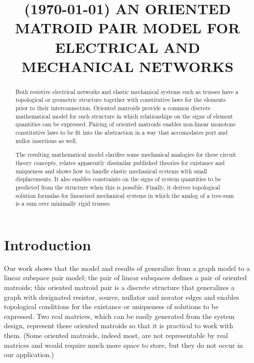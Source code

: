 \documentclass{article}
\title{\extra{REPORT:}
(\today)
AN ORIENTED MATROID PAIR MODEL FOR ELECTRICAL AND MECHANICAL NETWORKS
}
\newcommand{\extra}[1]{{\small{#1}}}
\begin{document}
%
\maketitle
%

\begin{abstract}
Both resistive electrical networks and elastic mechanical systems such
as trusses have a topological or geometric structure together with constitutive
laws for the elements prior to their interconnection.
Oriented matroids provide a common discrete mathematical model 
for such 
structure
in which relationships on the signs of element 
quantities can be expressed.
Pairing of oriented matroids
enables non-linear monotone constitutive laws to be fit
into the abstraction in a way that accomodates port and nullor
insertions as well.

The resulting mathematical model clarifies some mechanical analogies for 
these 
circuit theory concepts, 
relates apparently dissimilar published theories
for existance and uniqueness and shows how to 
handle elastic mechanical systems with small displacements.
It also enables constraints on the signs of system quantities
to be predicted from the structure when this is possible.
\extra{Finally, it 
derives topological solution formulas for linearized mechanical 
systems in which the analog of a tree-sum is a sum over minimally rigid
trusses.}
\end{abstract}
%

\section{Introduction}
\label{sec:intro}

Our work \cite{sdcOMP} shows that the model and results of 
\cite{HaslerDApplMath,HaslerNeirynck} generalize from a graph model to a
linear subspace pair model;
the pair of linear subspaces defines a pair of oriented matroids;
this oriented matroid pair is a discrete structure that
generalizes a graph with designated resistor, source, nullator
and norator edges and enables 
topological conditions
for the existance or uniqueness of solutions
to be expressed. Two real matrices, which can be easily generated
from the system design, represent these oriented matroids so that 
it is practical to work with them.  (Some oriented matroids, indeed 
most, are not representable by real matrices and would require much more
space to store, but they do not occur in our application.)
\end{document}
